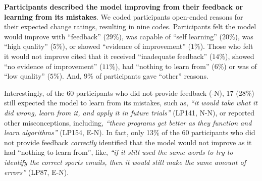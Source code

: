 \textbf{Participants described the model improving from their feedback or learning from its mistakes}.
We coded participants open-ended reasons for their expected change ratings, resulting in nine codes. Participants felt the model would improve with ``feedback'' ($29\%$), was capable of ``self learning'' ($20\%$), was ``high quality'' ($5\%$), or showed ``evidence of improvement'' ($1\%$). 
%
Those who felt it would not improve cited that it received ``inadequate feedback'' ($14\%$), showed ``no evidence of improvement'' ($11\%$), had ``nothing to learn from'' ($6\%$) or was of ``low quality'' ($5\%$). And, $9\%$ of participants gave ``other'' reasons.
%

Interestingly, of the 60 participants who did not provide feedback (-N), 17 (28\%) still expected the model to learn from its mistakes, such as,  \textit{``it would take what it did wrong, learn from it, and apply it in future trials''} (LP141, N-N), or reported other misconceptions, including, \textit{``these programs get better as they function and learn algorithms''} (LP154, E-N). 
%
In fact, only 13\% of the 60 participants who did not provide feedback \textit{correctly} identified that the model would not improve as it had ``nothing to learn from'', like, \textit{``if it still used the same words to try to identify the correct sports emails, then it would still make the same amount of errors''} (LP87, E-N).


